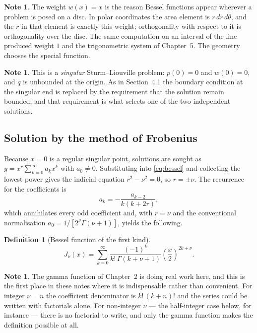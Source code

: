 \documentclass[12pt,a4paper]{report}
\theoremstyle{definition}
\newtheorem{defn}[thm]{Definition}
\newtheorem{note}[thm]{Note}
\theoremstyle{plain}
\begin{document}
\begin{note}
The weight $w(x)=x$ is the reason Bessel functions appear wherever a problem is
posed on a disc. In polar coordinates the area element is $r\,dr\,d\theta$, and
the $r$ in that element is exactly this weight; orthogonality with respect to
it is orthogonality over the disc. The same computation on an interval of the
line produced weight $1$ and the trigonometric system of Chapter~5. The
geometry chooses the special function.
\end{note}

\begin{note}
This is a \emph{singular} Sturm--Liouville problem: $p(0)=0$ and $w(0)=0$, and
$q$ is unbounded at the origin. As in Section~4.1 the boundary condition at the
singular end is replaced by the requirement that the solution remain bounded,
and that requirement is what selects one of the two independent solutions.
\end{note}

\subsection*{Solution by the method of Frobenius}

Because $x=0$ is a regular singular point, solutions are sought as
$y = x^{r}\sum^{\infty}_{k=0}a_k x^{k}$ with $a_0\neq0$. Substituting into
\eqref{eq:bessel} and collecting the lowest power gives the indicial equation
$r^{2}-\nu^{2}=0$, so $r=\pm\nu$. The recurrence for the coefficients is
$$a_k = -\frac{a_{k-2}}{k\left(k+2r\right)},$$
which annihilates every odd coefficient and, with $r=\nu$ and the conventional
normalisation $a_0 = 1/\left[2^{\nu}\Gamma(\nu+1)\right]$, yields the following.

\begin{defn}[Bessel function of the first kind]
$$J_{\nu}(x) = \sum^{\infty}_{k=0}
\frac{(-1)^{k}}{k!\,\Gamma(k+\nu+1)}\left(\frac{x}{2}\right)^{2k+\nu}.$$
\end{defn}

\begin{note}
The gamma function of Chapter~2 is doing real work here, and this is the first
place in these notes where it is indispensable rather than convenient. For
integer $\nu=n$ the coefficient denominator is $k!\,(k+n)!$ and the series could
be written with factorials alone. For non-integer $\nu$ --- the half-integer
case below, for instance --- there is no factorial to write, and only the gamma
function makes the definition possible at all.
\end{note}
\end{document}

